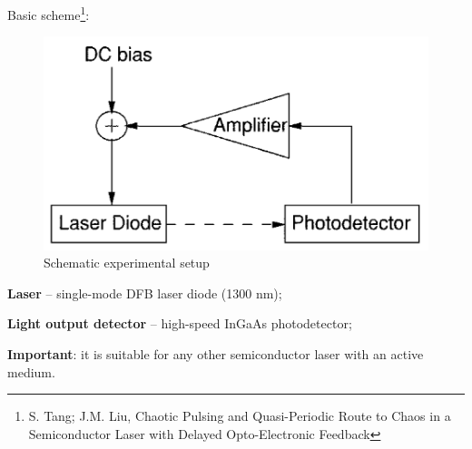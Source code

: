 Basic scheme\footnote{
S. Tang; J.M. Liu,
 Chaotic Pulsing and Quasi-Periodic Route to Chaos in a Semiconductor Laser with Delayed Opto-Electronic Feedback    
}:


\phantom{42}

\begin{minipage}{0.4\textwidth}
\begin{figure}[h]
    \centering
    \hspace{-10 mm}
    \includegraphics[width=1.2\textwidth]{images/SS.png}
    \caption{Schematic experimental setup}
\end{figure}
\end{minipage}
\hfill
\begin{minipage}{0.55\textwidth}

\textbf{Laser} -- single-mode DFB laser diode (1300 nm);

\textbf{Light output detector} -- high-speed InGaAs photodetector;

\end{minipage}


\textbf{Important}: it is suitable for any other semiconductor laser with an active medium.



